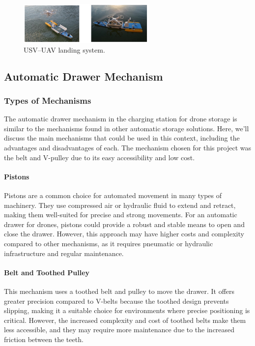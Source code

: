     \begin{figure}[h!]
        \centering
        \includegraphics[width=0.6\textwidth]{pictures/mobile_3.png}
        \caption{USV–UAV landing system.}
        \label{fig:mobile_charging}
    \end{figure}


\subsection{Automatic Drawer Mechanism}
    \subsubsection{Types of Mechanisms}
    The automatic drawer mechanism in the charging station for drone storage is similar to the mechanisms found in other automatic storage solutions. Here, we'll discuss the main mechanisms that could be used in this context, including the advantages and disadvantages of each. The mechanism chosen for this project was the belt and V-pulley due to its easy accessibility and low cost.
    
    \paragraph{Pistons} Pistons are a common choice for automated movement in many types of machinery. They use compressed air or hydraulic fluid to extend and retract, making them well-suited for precise and strong movements. For an automatic drawer for drones, pistons could provide a robust and stable means to open and close the drawer. However, this approach may have higher costs and complexity compared to other mechanisms, as it requires pneumatic or hydraulic infrastructure and regular maintenance.
    
    \paragraph{Belt and Toothed Pulley} This mechanism uses a toothed belt and pulley to move the drawer. It offers greater precision compared to V-belts because the toothed design prevents slipping, making it a suitable choice for environments where precise positioning is critical. However, the increased complexity and cost of toothed belts make them less accessible, and they may require more maintenance due to the increased friction between the teeth.
    
